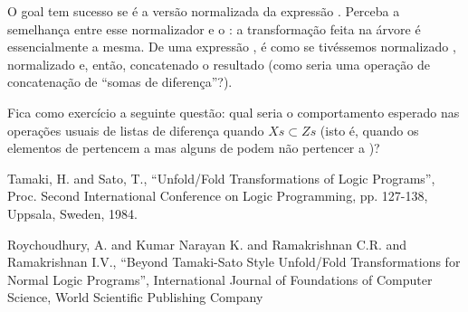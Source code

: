     \begin{listing}
\inputminted{prolog}{../Exemplos/Cap3/progn_normalized_sum.pl}\label{lst:norm}
    \end{listing}

\noindent O goal  tem sucesso se  é a versão normalizada da expressão .
Perceba a semelhança entre esse normalizador e o : a transformação feita na árvore é essencialmente a mesma. De uma
expressão , é como se tivéssemos normalizado , normalizado  e, então, concatenado o
resultado (como seria uma operação de concatenação de ``somas de diferença''?).

Fica como exercício a seguinte questão: qual seria o comportamento esperado nas operações usuais de listas de diferença
 quando $Xs \subset Zs$
(isto é, quando os elementos de  pertencem a  mas alguns de  podem não pertencer a )?


  \begin{thebibliography}{1}


    Tamaki, H. and Sato, T.,
    ``Unfold/Fold Transformations of Logic Programs'',
    Proc. Second International Conference on Logic Programming,
    pp. 127-138,
    Uppsala, Sweden, 1984.


    Roychoudhury, A. and Kumar Narayan K. and Ramakrishnan C.R. and Ramakrishnan I.V.,
    ``Beyond Tamaki-Sato Style Unfold/Fold Transformations for Normal Logic Programs'',
    International Journal of Foundations of Computer Science,
    World Scientific Publishing Company


  \end{thebibliography}


